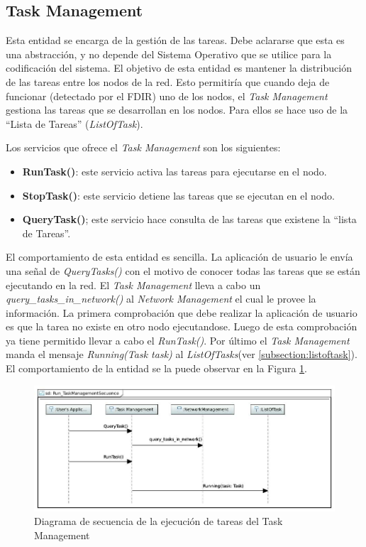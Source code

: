 \subsection{Task Management}
Esta entidad se encarga de la gestión de las tareas. Debe aclararse que esta es
una abstracción, y no depende del Sistema Operativo que se utilice para la
codificación del sistema. El objetivo de esta entidad es mantener la
distribución de las tareas entre los nodos de la red. Esto permitiría que cuando
deja de funcionar (detectado por el \ac{FDIR}) uno de los nodos, el
\textit{Task Management} gestiona las tareas que se desarrollan en los nodos.
Para ellos se hace uso de la ``Lista de Tareas'' (\textit{ListOfTask}).
 
Los servicios que ofrece el \textit{Task Management} son los siguientes:
\begin{itemize}
\item \textbf{RunTask()}: este servicio activa las tareas para ejecutarse en
  el nodo.
\item \textbf{StopTask()}: este servicio detiene las tareas que se ejecutan en
  el nodo.
\item \textbf{QueryTask()}; este servicio hace consulta de las tareas que
  existene la ``lista de Tareas''.
\end{itemize}

El comportamiento de esta entidad es sencilla. La aplicación de usuario le envía
una señal de \textit{QueryTasks()} con el motivo de conocer todas las tareas que
se están ejecutando en la red. El \textit{Task Management} lleva a cabo un
\textit{query\_tasks\_in\_network()} al \textit{Network Management} el cual le
provee la información. La primera comprobación que debe realizar la
aplicación de usuario es que la tarea no existe en otro nodo ejecutandose. Luego
de esta comprobación ya tiene permitido llevar a cabo el \textit{RunTask()}. Por
último el \textit{Task Management} manda el mensaje \textit{Running(Task task)}
al \textit{ListOfTasks}(ver \ref{subsection:listoftask}). El comportamiento de
la entidad se la puede observar en la Figura \ref{fig:TaskManagement_RunTask}.

\begin{figure}[h!]
 \centering
 \includegraphics[scale=0.4]{images/Secciones/AppendixA/TaskManagement.JPG}
  \caption{Diagrama de secuencia de la ejecución de tareas del Task Management}
\label{fig:TaskManagement_RunTask}
\end{figure}

